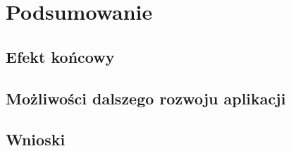 \chapter{Podsumowanie}
\section{Efekt końcowy}
\section{Możliwości dalszego rozwoju aplikacji}
\section{Wnioski}